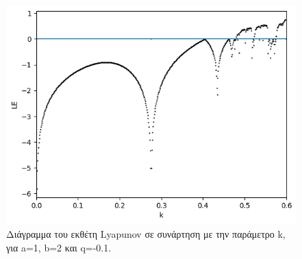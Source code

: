 \begin{figure}[h!]
	\centering
	\includegraphics[width=0.6\linewidth]{"LateX images/graphs/g6 "}
	\caption{Διάγραμμα του εκθέτη Lyapunov σε συνάρτηση με την παράμετρο k, για a=1, b=2 και q=-0.1.}
	\label{f:g7}
\end{figure}


